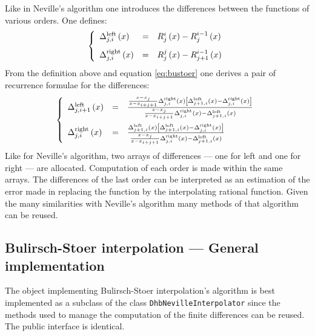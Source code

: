 \documentclass[twoside]{book}
\begin{document}
Like in Neville's algorithm one introduces the differences between
the functions of various orders. One defines:
\begin{equation}
\left\{
\begin{array}{lcl}
    \Delta_{j,i}^{\mathop{\rm
left}}\left(x\right) & = & R_j^i\left(x\right) -
R_j^{i-1}\left(x\right)\\*[2ex]
    \Delta_{j,i}^{\mathop{\rm
right}}\left(x\right) & = & R_j^j\left(x\right) -
R_{j+1}^{i-1}\left(x\right)
  \end{array}\right.
\end{equation}
From the definition above and equation \ref{eq:bustoer} one
derives a pair of recurrence formulae for the differences:
\begin{equation}
\left\{
\begin{array}{lcl}
    \Delta_{j,i+1}^{\mathop{\rm
left}}\left(x\right) & = &{{x-x_j \over x - x_{i+j+1}}
\Delta_{j,i}^{\mathop{\rm right}}\left(x\right)
\left[\Delta_{j+1,i}^{\mathop{\rm left}}\left(x\right) -
\Delta_{j,i}^{\mathop{\rm right}}\left(x\right)\right] \over
{x-x_j \over x-x_{i+j+1}} \Delta_{j,i}^{\mathop{\rm
right}}\left(x\right) - \Delta_{j+1,i}^{\mathop{\rm
left}}\left(x\right)}
\\*[3ex]
    \Delta_{j,i}^{\mathop{\rm
right}}\left(x\right) & = &{ \Delta_{j+1,i}^{\mathop{\rm
left}}\left(x\right) \left[\Delta_{j+1,i}^{\mathop{\rm
left}}\left(x\right) - \Delta_{j,i}^{\mathop{\rm
right}}\left(x\right)\right] \over {x-x_j \over x-x_{i+j+1}}
\Delta_{j,i}^{\mathop{\rm right}}\left(x\right) -
\Delta_{j+1,i}^{\mathop{\rm left}}\left(x\right)}
  \end{array}\right.
\end{equation}
Like for Neville's algorithm, two arrays of differences --- one
for left and one for right --- are allocated. Computation of each
order is made within the same arrays. The differences of the last
order can be interpreted as an estimation of the error made in
replacing the function by the interpolating rational function.
Given the many similarities with Neville's algorithm many methods
of that algorithm can be reused.

\subsection{Bulirsch-Stoer interpolation --- General implementation}
 The object implementing
Bulirsch-Stoer interpolation's algorithm is best implemented as a
subclass of the class {\tt DhbNevilleInterpolator} since the
methods used to manage the computation of the finite differences
can be reused. The public interface is identical.
\end{document}
